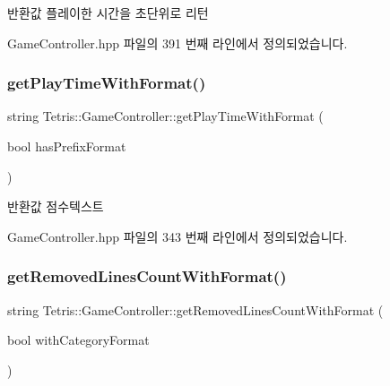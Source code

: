 \begin{DoxyReturn}{반환값}
플레이한 시간을 초단위로 리턴 
\end{DoxyReturn}


Game\+Controller.\+hpp 파일의 391 번째 라인에서 정의되었습니다.

\mbox{\label{class_tetris_1_1_game_controller_a71765a7d8b76400832c98002a113ed26}} 
\subsubsection{\texorpdfstring{get\+Play\+Time\+With\+Format()}{getPlayTimeWithFormat()}}
{\footnotesize\ttfamily string Tetris\+::\+Game\+Controller\+::get\+Play\+Time\+With\+Format (\begin{DoxyParamCaption}\item[{bool}]{has\+Prefix\+Format }\end{DoxyParamCaption})\hspace{0.3cm}{\ttfamily [inline]}}

\begin{DoxyReturn}{반환값}
점수텍스트 
\end{DoxyReturn}


Game\+Controller.\+hpp 파일의 343 번째 라인에서 정의되었습니다.

\mbox{\label{class_tetris_1_1_game_controller_acd543d841613ed6c3645659d34e0b723}} 
\subsubsection{\texorpdfstring{get\+Removed\+Lines\+Count\+With\+Format()}{getRemovedLinesCountWithFormat()}}
{\footnotesize\ttfamily string Tetris\+::\+Game\+Controller\+::get\+Removed\+Lines\+Count\+With\+Format (\begin{DoxyParamCaption}\item[{bool}]{with\+Category\+Format }\end{DoxyParamCaption})\hspace{0.3cm}{\ttfamily [inline]}}

